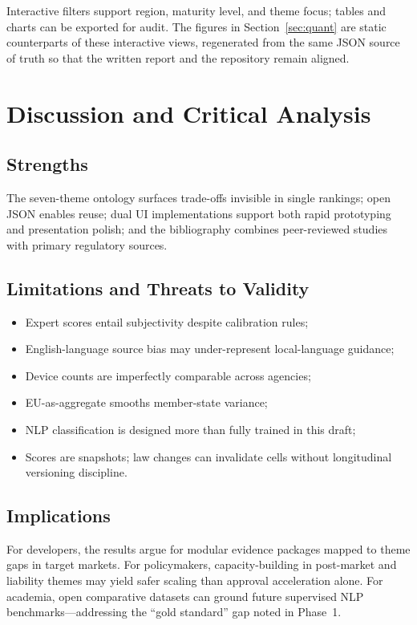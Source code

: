 Interactive filters support region, maturity level, and theme focus; tables and charts can be exported for audit. The figures in Section~\ref{sec:quant} are static counterparts of these interactive views, regenerated from the same JSON source of truth so that the written report and the repository remain aligned.


\section{Discussion and Critical Analysis}
\label{sec:discussion}

\subsection{Strengths}
The seven-theme ontology surfaces trade-offs invisible in single rankings; open JSON enables reuse; dual UI implementations support both rapid prototyping and presentation polish; and the bibliography combines peer-reviewed studies with primary regulatory sources.

\subsection{Limitations and Threats to Validity}
\begin{itemize}[noitemsep]
  \item Expert scores entail subjectivity despite calibration rules;
  \item English-language source bias may under-represent local-language guidance;
  \item Device counts are imperfectly comparable across agencies;
  \item EU-as-aggregate smooths member-state variance;
  \item NLP classification is designed more than fully trained in this draft;
  \item Scores are snapshots; law changes can invalidate cells without longitudinal versioning discipline.
\end{itemize}

\subsection{Implications}
For developers, the results argue for modular evidence packages mapped to theme gaps in target markets. For policymakers, capacity-building in post-market and liability themes may yield safer scaling than approval acceleration alone. For academia, open comparative datasets can ground future supervised NLP benchmarks---addressing the ``gold standard'' gap noted in Phase~1.

